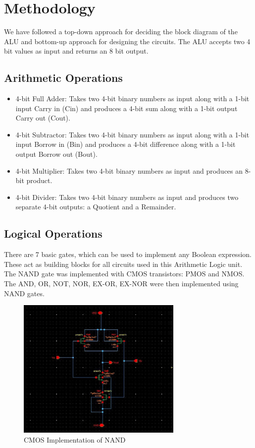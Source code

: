 \documentclass[conference]{IEEEtran}
\begin{document}
\section{Methodology}\label{C}
We have followed a top-down approach for deciding the block diagram of the ALU and bottom-up approach for designing the circuits. The ALU accepts two 4 bit values as input and returns an 8 bit output.

\subsection{Arithmetic Operations}\label{CA}
\begin{itemize}
\item{4-bit Full Adder: Takes two 4-bit binary numbers as input along with a 1-bit input Carry in (Cin) and produces a 4-bit sum along with a 1-bit output Carry out (Cout).}
\item{4-bit Subtractor: Takes two 4-bit binary numbers as input along with a 1-bit input Borrow in (Bin) and produces a 4-bit difference along with a 1-bit output Borrow out (Bout).}
\item{4-bit Multiplier: Takes two 4-bit binary numbers as input and produces an 8-bit product.}
\item{4-bit Divider: Takes two 4-bit binary numbers as input and produces two separate 4-bit outputs: a Quotient and a Remainder.}
\end{itemize}

 
\subsection{Logical Operations}\label{CB}
There are 7 basic gates, which can be used to implement any Boolean expression. These act as building blocks for all circuits used in this Arithmetic Logic unit.\\
The NAND gate was implemented with CMOS transistors: PMOS and NMOS. The AND, OR, NOT, NOR, EX-OR, EX-NOR were then implemented using NAND gates.
\begin{figure}[H]
\centerline{\includegraphics[width=8cm,keepaspectratio,]{"1bit_NAND.png"}}
\caption{CMOS Implementation of NAND}
\label{fig2}
\end{figure}
\end{document}
